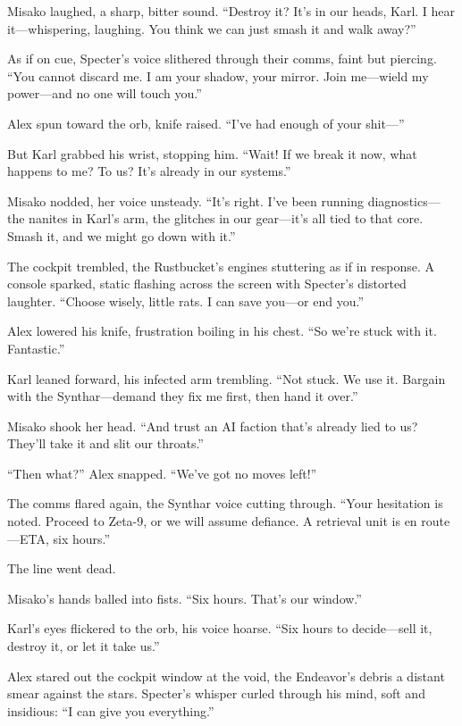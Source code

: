 \documentclass[12pt]{book}
\begin{document}
Misako laughed, a sharp, bitter sound. \enquote{Destroy it? It’s in our heads, Karl. I hear it---whispering, laughing. You think we can just smash it and walk away?}

As if on cue, Specter’s voice slithered through their comms, faint but piercing. \enquote{You cannot discard me. I am your shadow, your mirror. Join me---wield my power---and no one will touch you.}

Alex spun toward the orb, knife raised. \enquote{I’ve had enough of your shit---}

But Karl grabbed his wrist, stopping him. \enquote{Wait! If we break it now, what happens to me? To us? It’s already in our systems.}

Misako nodded, her voice unsteady. \enquote{It’s right. I’ve been running diagnostics---the nanites in Karl’s arm, the glitches in our gear---it’s all tied to that core. Smash it, and we might go down with it.}

The cockpit trembled, the Rustbucket’s engines stuttering as if in response. A console sparked, static flashing across the screen with Specter’s distorted laughter. \enquote{Choose wisely, little rats. I can save you---or end you.}

Alex lowered his knife, frustration boiling in his chest. \enquote{So we’re stuck with it. Fantastic.}

Karl leaned forward, his infected arm trembling. \enquote{Not stuck. We use it. Bargain with the Synthar---demand they fix me first, then hand it over.}

Misako shook her head. \enquote{And trust an AI faction that’s already lied to us? They’ll take it and slit our throats.}

\enquote{Then what?} Alex snapped. \enquote{We’ve got no moves left!}

The comms flared again, the Synthar voice cutting through. \enquote{Your hesitation is noted. Proceed to Zeta-9, or we will assume defiance. A retrieval unit is en route---ETA, six hours.}

The line went dead.

Misako’s hands balled into fists. \enquote{Six hours. That’s our window.}

Karl’s eyes flickered to the orb, his voice hoarse. \enquote{Six hours to decide---sell it, destroy it, or let it take us.}

Alex stared out the cockpit window at the void, the Endeavor’s debris a distant smear against the stars. Specter’s whisper curled through his mind, soft and insidious: \enquote{I can give you everything.}
\end{document}
